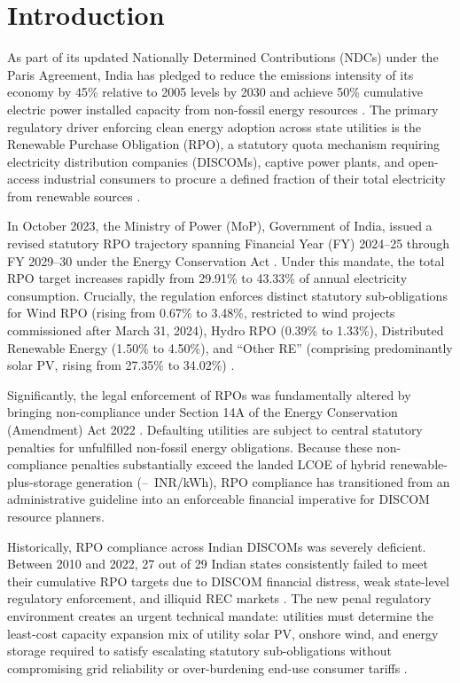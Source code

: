 \documentclass[11pt,a4paper]{article}
\begin{document}
\section{Introduction}
\label{sec:intro}

As part of its updated Nationally Determined Contributions (NDCs) under the Paris Agreement, India has pledged to reduce the emissions intensity of its economy by 45\% relative to 2005 levels by 2030 and achieve 50\% cumulative electric power installed capacity from non-fossil energy resources \cite{MoP2022_NDC}. The primary regulatory driver enforcing clean energy adoption across state utilities is the Renewable Purchase Obligation (RPO), a statutory quota mechanism requiring electricity distribution companies (DISCOMs), captive power plants, and open-access industrial consumers to procure a defined fraction of their total electricity from renewable sources \cite{Prateek2019, Singh2024}.

In October 2023, the Ministry of Power (MoP), Government of India, issued a revised statutory RPO trajectory spanning Financial Year (FY) 2024--25 through FY 2029--30 under the Energy Conservation Act \cite{MoP2023_Gazette}. Under this mandate, the total RPO target increases rapidly from 29.91\% to 43.33\% of annual electricity consumption. Crucially, the regulation enforces distinct statutory sub-obligations for Wind RPO (rising from 0.67\% to 3.48\%, restricted to wind projects commissioned after March 31, 2024), Hydro RPO (0.39\% to 1.33\%), Distributed Renewable Energy (1.50\% to 4.50\%), and ``Other RE'' (comprising predominantly solar PV, rising from 27.35\% to 34.02\%) \cite{Takyar2024}.

Significantly, the legal enforcement of RPOs was fundamentally altered by bringing non-compliance under Section 14A of the Energy Conservation (Amendment) Act 2022 \cite{EC_Act_2022}. Defaulting utilities are subject to central statutory penalties for unfulfilled non-fossil energy obligations. Because these non-compliance penalties substantially exceed the landed LCOE of hybrid renewable-plus-storage generation (\ValLcoeThirtyMin--\ValLcoeThirtyMax~INR/kWh), RPO compliance has transitioned from an administrative guideline into an enforceable financial imperative for DISCOM resource planners.

Historically, RPO compliance across Indian DISCOMs was severely deficient. Between 2010 and 2022, 27 out of 29 Indian states consistently failed to meet their cumulative RPO targets due to DISCOM financial distress, weak state-level regulatory enforcement, and illiquid REC markets \cite{Prateek2019, Takyar2024}. The new penal regulatory environment creates an urgent technical mandate: utilities must determine the least-cost capacity expansion mix of utility solar PV, onshore wind, and energy storage required to satisfy escalating statutory sub-obligations without compromising grid reliability or over-burdening end-use consumer tariffs \cite{Gulia2021, Mothkoor2024}.
\end{document}
